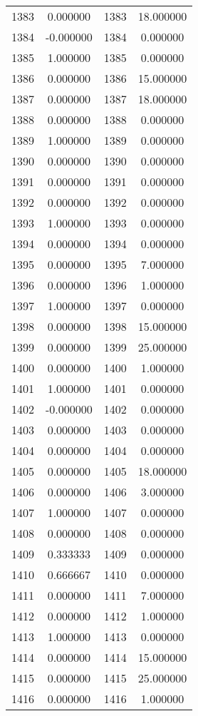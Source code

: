 \documentclass[12pt]{article}
\begin{document}
\begin{longtable}{@{}cccc@{}}
1383 & 0.000000 & 1383 & 18.000000 \\
1384 & -0.000000 & 1384 & 0.000000 \\
1385 & 1.000000 & 1385 & 0.000000 \\
1386 & 0.000000 & 1386 & 15.000000 \\
1387 & 0.000000 & 1387 & 18.000000 \\
1388 & 0.000000 & 1388 & 0.000000 \\
1389 & 1.000000 & 1389 & 0.000000 \\
1390 & 0.000000 & 1390 & 0.000000 \\
1391 & 0.000000 & 1391 & 0.000000 \\
1392 & 0.000000 & 1392 & 0.000000 \\
1393 & 1.000000 & 1393 & 0.000000 \\
1394 & 0.000000 & 1394 & 0.000000 \\
1395 & 0.000000 & 1395 & 7.000000 \\
1396 & 0.000000 & 1396 & 1.000000 \\
1397 & 1.000000 & 1397 & 0.000000 \\
1398 & 0.000000 & 1398 & 15.000000 \\
1399 & 0.000000 & 1399 & 25.000000 \\
1400 & 0.000000 & 1400 & 1.000000 \\
1401 & 1.000000 & 1401 & 0.000000 \\
1402 & -0.000000 & 1402 & 0.000000 \\
1403 & 0.000000 & 1403 & 0.000000 \\
1404 & 0.000000 & 1404 & 0.000000 \\
1405 & 0.000000 & 1405 & 18.000000 \\
1406 & 0.000000 & 1406 & 3.000000 \\
1407 & 1.000000 & 1407 & 0.000000 \\
1408 & 0.000000 & 1408 & 0.000000 \\
1409 & 0.333333 & 1409 & 0.000000 \\
1410 & 0.666667 & 1410 & 0.000000 \\
1411 & 0.000000 & 1411 & 7.000000 \\
1412 & 0.000000 & 1412 & 1.000000 \\
1413 & 1.000000 & 1413 & 0.000000 \\
1414 & 0.000000 & 1414 & 15.000000 \\
1415 & 0.000000 & 1415 & 25.000000 \\
1416 & 0.000000 & 1416 & 1.000000 \\

\end{longtable}
\end{document}
